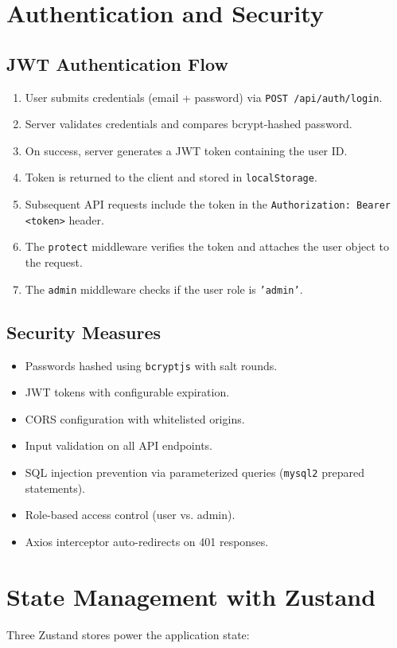 \documentclass[12pt,a4paper]{report}
\begin{document}
\section{Authentication and Security}
\subsection{JWT Authentication Flow}
\begin{enumerate}[noitemsep]
  \item User submits credentials (email + password) via \texttt{POST /api/auth/login}.
  \item Server validates credentials and compares bcrypt-hashed password.
  \item On success, server generates a JWT token containing the user ID.
  \item Token is returned to the client and stored in \texttt{localStorage}.
  \item Subsequent API requests include the token in the \texttt{Authorization: Bearer <token>} header.
  \item The \texttt{protect} middleware verifies the token and attaches the user object to the request.
  \item The \texttt{admin} middleware checks if the user role is \texttt{'admin'}.
\end{enumerate}

\subsection{Security Measures}
\begin{itemize}[noitemsep]
  \item Passwords hashed using \texttt{bcryptjs} with salt rounds.
  \item JWT tokens with configurable expiration.
  \item CORS configuration with whitelisted origins.
  \item Input validation on all API endpoints.
  \item SQL injection prevention via parameterized queries (\texttt{mysql2} prepared statements).
  \item Role-based access control (user vs. admin).
  \item Axios interceptor auto-redirects on 401 responses.
\end{itemize}

\section{State Management with Zustand}
Three Zustand stores power the application state:
\end{document}

